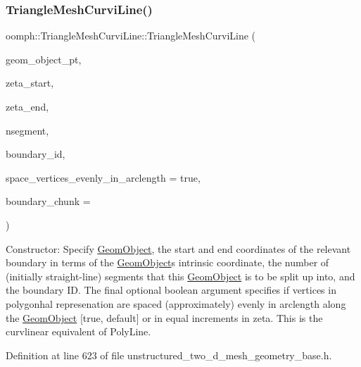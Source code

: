 \subsubsection{\texorpdfstring{Triangle\+Mesh\+Curvi\+Line()}{TriangleMeshCurviLine()}}
{\footnotesize\ttfamily oomph\+::\+Triangle\+Mesh\+Curvi\+Line\+::\+Triangle\+Mesh\+Curvi\+Line (\begin{DoxyParamCaption}\item[{\hyperlink{classoomph_1_1GeomObject}{Geom\+Object} $\ast$}]{geom\+\_\+object\+\_\+pt,  }\item[{const double \&}]{zeta\+\_\+start,  }\item[{const double \&}]{zeta\+\_\+end,  }\item[{const unsigned \&}]{nsegment,  }\item[{const unsigned \&}]{boundary\+\_\+id,  }\item[{const bool \&}]{space\+\_\+vertices\+\_\+evenly\+\_\+in\+\_\+arclength = {\ttfamily true},  }\item[{const unsigned \&}]{boundary\+\_\+chunk = {} }\end{DoxyParamCaption})\hspace{0.3cm}{\ttfamily [inline]}}



Constructor\+: Specify \hyperlink{classoomph_1_1GeomObject}{Geom\+Object}, the start and end coordinates of the relevant boundary in terms of the \hyperlink{classoomph_1_1GeomObject}{Geom\+Object}\textquotesingle{}s intrinsic coordinate, the number of (initially straight-\/line) segments that this \hyperlink{classoomph_1_1GeomObject}{Geom\+Object} is to be split up into, and the boundary ID. The final optional boolean argument specifies if vertices in polygonhal represenation are spaced (approximately) evenly in arclength along the \hyperlink{classoomph_1_1GeomObject}{Geom\+Object} \mbox{[}true, default\mbox{]} or in equal increments in zeta. This is the curvlinear equivalent of Poly\+Line. 



Definition at line 623 of file unstructured\+\_\+two\+\_\+d\+\_\+mesh\+\_\+geometry\+\_\+base.\+h.

\mbox{\label{classoomph_1_1TriangleMeshCurviLine_ab08a474ba9e5067b239aba84ab998710}} 
